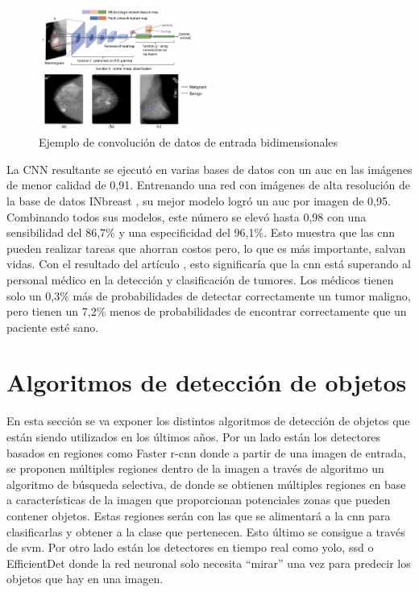 \begin{figure}[ht]
\centering
\includegraphics[width=0.5\textwidth]{img/chapters/estado-del-arte/cnn-mamografia.png}
\caption{\label{fig:ejemplo-mamografia}Ejemplo de convolución de datos de entrada bidimensionales}
\end{figure}

La CNN resultante se ejecutó en varias bases de datos con un \gls{auc} en las imágenes de menor calidad de 0,91. Entrenando una red con imágenes de alta resolución de la base de datos INbreast \cite{moreira2011}, su mejor modelo logró un \gls{auc} por imagen de 0,95. Combinando todos sus modelos, este número se elevó hasta 0,98 con una sensibilidad del 86,7\% y una especificidad del 96,1\%. Esto muestra que las \gls{cnn} pueden realizar tareas que ahorran costos pero, lo que es más importante, salvan vidas. Con el resultado del artículo \cite{mammography2019}, esto significaría que la \gls{cnn} está superando al personal médico en la detección y clasificación de tumores. Los médicos tienen solo un 0,3\% más de probabilidades de detectar correctamente un tumor maligno, pero tienen un 7,2\% menos de probabilidades de encontrar correctamente que un paciente esté sano.

\section{Algoritmos de detección de objetos}
\label{sec:tecnicas-utilizadas-detection}

En esta sección se va exponer los distintos algoritmos de detección de objetos que están siendo utilizados en los últimos años. Por un lado están los detectores basados en regiones como Faster \gls{r-cnn} donde a partir de una imagen de entrada, se proponen múltiples regiones dentro de la imagen a través de algoritmo un algoritmo de búsqueda selectiva, de donde se obtienen múltiples regiones en base a características de la imagen que proporcionan potenciales zonas que pueden contener objetos. Estas regiones serán con las que se alimentará a la \gls{cnn} para clasificarlas y obtener a la clase que pertenecen. Esto último se consigue a través de \gls{svm}. Por otro lado están los detectores en tiempo real como \gls{yolo}, \gls{ssd} o EfficientDet donde la red neuronal solo necesita ``mirar'' una vez para predecir los objetos que hay en una imagen.

